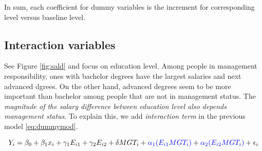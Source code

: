 \documentclass[]{book}
\newenvironment{Shaded}{\begin{snugshade}}{\end{snugshade}}
\newcommand{\CommentTok}[1]{\textcolor[rgb]{0.56,0.35,0.01}{\textit{#1}}}
\newcommand{\DataTypeTok}[1]{\textcolor[rgb]{0.13,0.29,0.53}{#1}}
\newcommand{\KeywordTok}[1]{\textcolor[rgb]{0.13,0.29,0.53}{\textbf{#1}}}
\newcommand{\NormalTok}[1]{#1}
\newcommand{\OperatorTok}[1]{\textcolor[rgb]{0.81,0.36,0.00}{\textbf{#1}}}
\newcommand{\StringTok}[1]{\textcolor[rgb]{0.31,0.60,0.02}{#1}}
\theoremstyle{definition}
\theoremstyle{definition}
\theoremstyle{definition}
\theoremstyle{remark}
\begin{document}
In sum, each coefficient for dummy variables is the increment for corresponding level versus baseline level.

\hypertarget{moddummy2}{%
\subsection{Interaction variables}\label{moddummy2}}

See Figure \ref{fig:sald} and focus on education level. Among people in management responsibility, ones with bachelor degrees have the largest salaries and next advanced dgrees. On the other hand, advanced degrees seem to be more important than bachelor among people that are not in management status. The \emph{magnitude of the salary difference between education level also depends management status}. To explain this, we add \emph{interaction term} in the previous model \eqref{eq:dummymod}.

\begin{equation}
  Y_i = \beta_0 + \beta_1 x_i + \gamma_1 E_{i1} + \gamma_2 E_{i2} + \delta MGT_i + {\color{blue}{\alpha_1 (E_{i1} MGT_i)}} + {\color{blue}{\alpha_2 (E_{i2} MGT_i)}} + \epsilon_i
  \label{eq:dummymod2}
\end{equation}

\begin{Shaded}
\end{Shaded}
\end{document}
